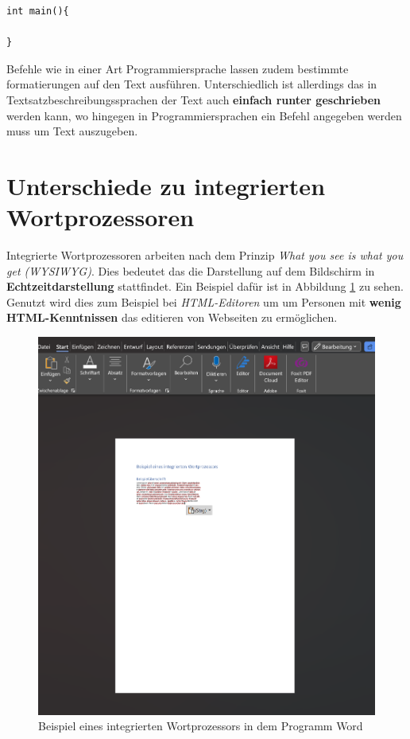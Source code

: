\begin{lstlisting}
int main(){

} 
\end{lstlisting}
Befehle wie in einer Art Programmiersprache lassen zudem bestimmte formatierungen auf den Text ausführen.
Unterschiedlich ist allerdings das in Textsatzbeschreibungssprachen der Text auch \textbf{einfach runter geschrieben} werden kann, wo hingegen in Programmiersprachen ein Befehl angegeben werden muss um Text auszugeben.

\section{Unterschiede zu integrierten Wortprozessoren}
Integrierte Wortprozessoren arbeiten nach dem Prinzip \textit{What you see is what you get (WYSIWYG)}. Dies bedeutet das die Darstellung auf dem Bildschirm in \textbf{Echtzeitdarstellung} stattfindet. Ein Beispiel dafür ist in Abbildung \ref{Wortprozessor} zu sehen. Genutzt wird dies zum Beispiel bei \textit{HTML-Editoren} um um Personen mit \textbf{wenig HTML-Kenntnissen} das editieren von Webseiten zu ermöglichen.

\begin{figure}[h]
	\centering
	\includegraphics[scale=0.5]{Images/Wortprozessor.png}
	\caption{Beispiel eines integrierten Wortprozessors in dem Programm Word}
	\label{Wortprozessor}
\end{figure}

